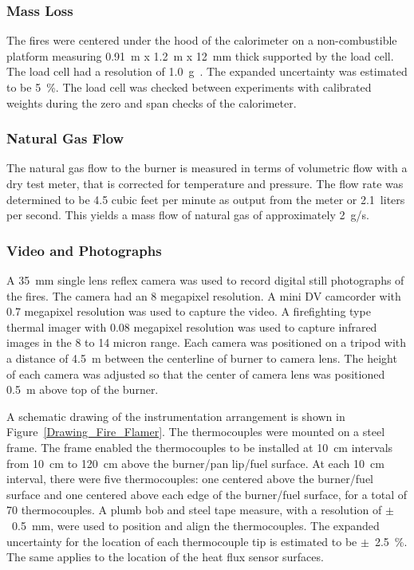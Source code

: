 \documentclass[twoside]{uocthesis}
\begin{document}
{\subsubsection{Mass Loss}

The fires were centered under the hood of the calorimeter on a non-combustible platform measuring 0.91~m x 1.2~m x 12~mm thick supported by the load cell.  The load cell had a resolution of 1.0~g~\cite{Mettler}. The expanded uncertainty was estimated to be 5~\%.  The load cell was checked between experiments with calibrated weights during the zero and span checks of the calorimeter.

\subsubsection{Natural Gas Flow}

The natural gas flow to the burner is measured in terms of volumetric flow with a dry test meter, that is corrected for temperature and pressure. The flow rate was determined to be 4.5 cubic feet per minute as output from the meter or 2.1~liters per second.  This yields a mass flow of natural gas of approximately 2~g/s.  

\subsubsection{Video and Photographs}

A 35~mm single lens reflex camera was used to record digital still photographs of the fires.  The camera had an 8 megapixel resolution.  A mini DV camcorder with 0.7 megapixel resolution was used to capture the video.  A firefighting type thermal imager with 0.08 megapixel resolution was used to capture infrared images in the 8 to 14 micron range.  Each camera was positioned on a tripod with a distance of 4.5~m between the centerline of burner to camera lens.  The height of each camera was adjusted so that the center of camera lens was positioned 0.5~m above top of the burner.

A schematic drawing of the instrumentation arrangement is shown in Figure~\ref{Drawing_Fire_Flamer}.  The thermocouples were mounted on a steel frame.  The frame enabled the thermocouples to be installed at 10~cm intervals from 10~cm to 120~cm above the burner/pan lip/fuel surface. At each 10~cm interval, there were five thermocouples: one centered above the burner/fuel surface and one centered above each edge of the burner/fuel surface, for a total of 70 thermocouples.  A plumb bob and steel tape measure, with a resolution of $\pm$~0.5~mm, were used to position and align the thermocouples.   The expanded uncertainty for the location of each thermocouple tip is estimated to be $\pm$~2.5~\%.  The same applies to the location of the heat flux sensor surfaces.

}
\end{document}
